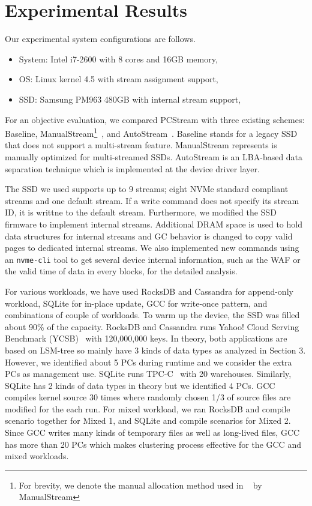 \section{Experimental Results}

Our experimental system configurations are follows.
\begin{itemize}
	\item System: Intel i7-2600 with 8 cores and 16GB memory,
	\item OS: Linux kernel 4.5 with stream assignment support,
	\item SSD: Samsung PM963 480GB with internal stream support,
\end{itemize}

For an objective evaluation, we compared \textsf{\small PCStream} with three
existing schemes: \textsf{\small Baseline}, \textsf{\small ManualStream}\footnote{For brevity, 
we denote the manual allocation method used in ~\cite{MultiStream} by 
\textsf{\small ManualStream}}~\cite{MultiStream}, and
\textsf{\small AutoStream}~\cite{AutoStream}.  \textsf{\small Baseline} stands for a legacy
SSD that does not support a multi-stream feature. \textsf{\small ManualStream} represents
is manually optimized for multi-streamed SSDs.
\textsf{\small AutoStream} is an LBA-based data separation technique which is
implemented at the device driver layer. 

The SSD we used supports up to 9 streams; eight NVMe standard compliant streams
and one default stream. If a write command does not specify its stream ID,
it is writtne to the default stream.
Furthermore, we modified the SSD firmware to implement internal streams.
Additional DRAM space is used to hold data structures for internal streams 
and GC behavior is changed to copy valid pages to dedicated internal streams.
We also implemented new commands using an \texttt{nvme-cli} tool to get several 
device internal information, such as the WAF or the valid time of data in every blocks, 
for the detailed analysis.

For various workloads, we have used RocksDB and Cassandra for append-only workload,
SQLite for in-place update, GCC for write-once pattern, and combinations of couple 
of workloads.
To warm up the device, the SSD was filled about 90\% of the capacity.
RocksDB and Cassandra runs Yahoo! Cloud Serving Benchmark (YCSB)~\cite{YCSB} 
with 120,000,000 keys.
In theory, both applications are based on LSM-tree so
mainly have 3 kinds of data types as analyzed in Section 3.
However, we identified about 5 PCs during runtime and we consider
the extra PCs as management use.
SQLite runs TPC-C~\cite{TPCC} with 20 warehouses. 
Similarly, SQLite has 2 kinds of data types in theory
but we identified 4 PCs.
GCC compiles kernel source 30 times where randomly chosen 1/3 of source files
are modified for the each run.
For mixed workload, we ran RocksDB and compile scenario together for Mixed 1,
and SQLite and compile scenarios for Mixed 2.
Since GCC writes many kinds of temporary files as well as
long-lived files, GCC has more than 20 PCs which makes
clustering process effective for the GCC and mixed workloads.


